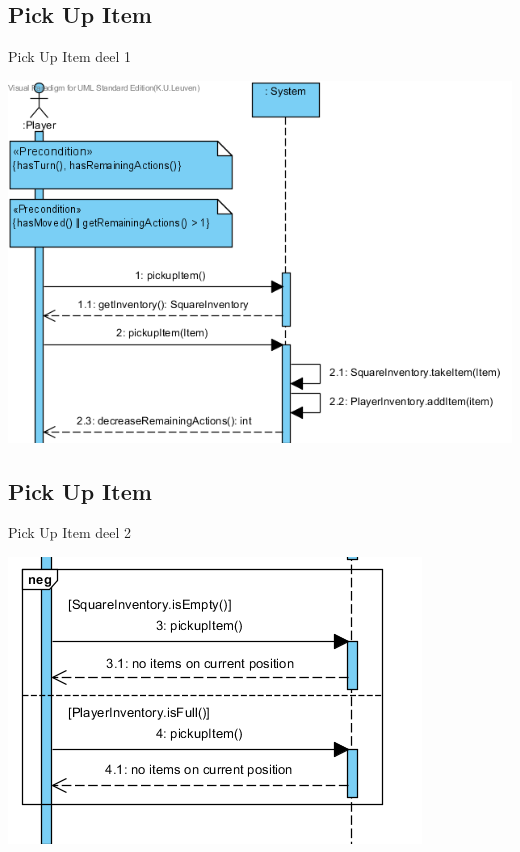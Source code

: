 \documentclass[t]{beamer}
\begin{document}
\subsection{Pick Up Item}
\begin{frame}{Pick Up Item deel 1}
\begin{center}
\includegraphics[scale=0.55]{images/SSDPickUpItem1}
\end{center}
\end{frame}

\subsection{Pick Up Item}
\begin{frame}{Pick Up Item deel 2}
\begin{center}
\includegraphics[scale=0.9]{images/SSDPickUpItem2}
\end{center}
\end{frame}
\end{document}
